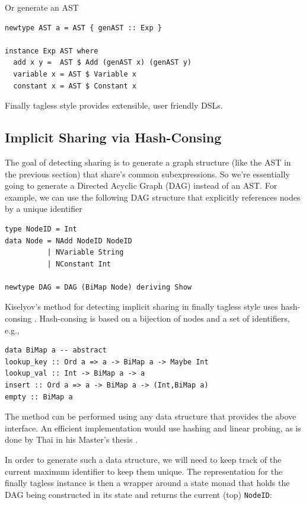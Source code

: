 \documentclass[runningheads]{llncs}
\begin{document}
Or generate an AST
\begin{verbatim}
newtype AST a = AST { genAST :: Exp }

instance Exp AST where
  add x y =  AST $ Add (genAST x) (genAST y)
  variable x = AST $ Variable x
  constant x = AST $ Constant x
\end{verbatim}

Finally tagless style provides extensible, user friendly DSLs.

\subsection{Implicit Sharing via Hash-Consing}

The goal of detecting sharing is to generate a graph structure (like the AST in
the previous section) that share's common subexpressions. So we're essentially
going to generate a Directed Acyclic Graph (DAG) instead of an AST. For example,
we can use the following DAG structure that explicitly references nodes by a
unique identifier

\begin{verbatim}
type NodeID = Int
data Node = NAdd NodeID NodeID
          | NVariable String
          | NConstant Int

newtype DAG = DAG (BiMap Node) deriving Show
\end{verbatim}

Kiselyov's method for detecting implicit sharing in finally tagless style uses
hash-consing \cite{kiselyov:sharing}. Hash-consing is based on a bijection of
nodes and a set of identifiers, e.g.,

\begin{verbatim}
data BiMap a -- abstract
lookup_key :: Ord a => a -> BiMap a -> Maybe Int
lookup_val :: Int -> BiMap a -> a
insert :: Ord a => a -> BiMap a -> (Int,BiMap a)
empty :: BiMap a
\end{verbatim}

The method can be performed using any data structure that provides the above
interface. An efficient implementation would use hashing and linear probing, as
is done by Thai in his Master's thesis \cite{thai2021type}.

In order to generate such a data structure, we will need to keep track of the
current maximum identifier to keep them unique. The representation for the
finally tagless instance is then a wrapper around a state monad that holds the
DAG being constructed in its state and returns the current (top)
\texttt{NodeID}:
\end{document}
